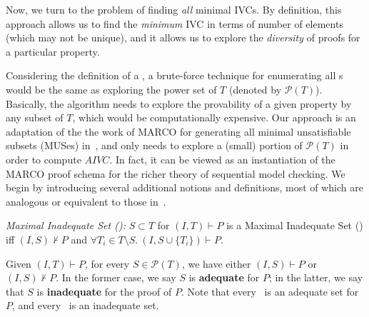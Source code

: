 \newcommand{\unknown}{\textsc{Unknown}}
\newcommand{\adequate}{\textsc{Adequate}}
\newcommand{\inadequate}{\textsc{Inadequate}}

\newcommand{\true}{\textsc{True}}
\newcommand{\false}{\textsc{False}}

Now, we turn to the problem of finding {\em all} minimal IVCs.  By definition, this approach allows us to find the {\em minimum} IVC in terms of number of elements (which may not be unique), and it allows us to explore the {\em diversity} of proofs for a particular property.

Considering the definition of a \mivc, a brute-force technique for enumerating all \mivc s would be the same as exploring the power set of $T$ (denoted by $ \mathcal{P}(T) $).
Basically, the algorithm needs to explore the provability of a
given property by any subset of $T$, which would be computationally expensive.  Our approach is an adaptation of the the work of MARCO for generating all minimal unsatisfiable subsets (MUSes) in~\cite{marco2016fast}, and only needs to explore a (small) portion of $\mathcal{P}(T)$ in order to compute $AIVC$.  In fact, it can be viewed as an instantiation of the MARCO proof schema for the richer theory of sequential model checking.  We begin by introducing several additional notions and definitions, most of which are analogous or equivalent to those in~\cite{marco2016fast}.


\begin{definition}{\emph{Maximal Inadequate Set (\mis):}}
  \label{def:mis}
  $S \subset T$ for $(I, T) \vdash P$ is a Maximal Inadequate Set (\mis) iff
  $(I, S) \nvdash P$ and $\forall T_i \in T\setminus S.~ (I, S\cup\{T_i\}) \vdash P$.
\end{definition}

Given $(I, T) \vdash P$, for every $S \in \mathcal{P}(T)$, we have either $(I, S) \vdash P$ or $(I, S) \nvdash P$. In the former case, we say $S$ is \textbf{adequate} for $P$; in the latter, we say that $S$ is \textbf{inadequate} for the proof of $P$.
Note that every \ivc ~is an adequate set for $P$, and every \mis ~is an inadequate set.


